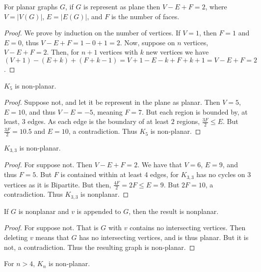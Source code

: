         \begin{theorem}
        For planar graphs $G$, if $G$ is represent as plane then $V-E+F=2$, where $V = |V(G)|$, $E=|E(G)|$, and $F$ is the number of faces.
        \end{theorem}
        \begin{proof}
        We prove by induction on the number of vertices. If $V=1$, then $F=1$ and $E=0$, thus $V-E+F=1-0+1=2$. Now, suppose on $n$ vertices, $V-E+F=2$. Then, for $n+1$ vertices with $k$ new vertices we have $(V+1)-(E+k)+(F+k-1) = V+1-E-k+F+k+1 = V-E+F=2$.
        \end{proof}
        \begin{theorem}
        $K_5$ is non-planar.
        \end{theorem}
        \begin{proof}
        Suppose not, and let it be represent in the plane as planar. Then $V=5$, $E = 10$, and thus $V-E = -5$, meaning $F = 7$. But each region is bounded by, at least, $3$ edges. As each edge is the boundary of at least $2$ regions, $\frac{3F}{2} \leq E$. But $\frac{3F}{2} = 10.5$ and $E=10$, a contradiction. Thus $K_5$ is non-planar.
        \end{proof}
        \begin{theorem}
        $K_{3,3}$ is non-planar.
        \end{theorem}
        \begin{proof}
        For suppose not. Then $V-E+F=2$. We have that $V=6$, $E= 9$, and thus $F=5$. But $F$ is contained within at least 4 edges, for $K_{3,3}$ has no cycles on $3$ vertices as it is Bipartite. But then, $\frac{4F}{2} = 2F \leq E = 9$. But $2F = 10$, a contradiction. Thus $K_{3,3}$ is nonplanar.
        \end{proof}
        \begin{theorem}
        If $G$ is nonplanar and $v$ is appended to $G$, then the result is nonplanar.
        \end{theorem}
        \begin{proof}
        For suppose not. That is $G$ with $v$ contains no intersecting vertices. Then deleting $v$ means that $G$ has no intersecting vertices, and is thus planar. But it is not, a contradiction. Thus the resulting graph is non-planar.
        \end{proof}
        \begin{theorem}
        For $n>4$, $K_n$ is non-planar.
        \end{theorem}
